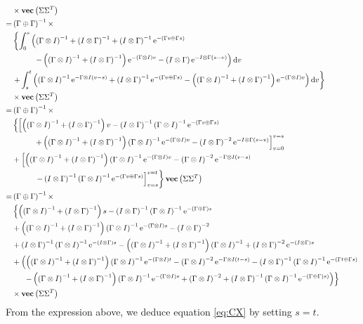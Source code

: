 \documentclass[10pt,a4paper]{article}
\newcommand{\rmd}{\text{d}}
\newcommand{\e}{\text{e}}
\newcommand{\inv}{^{-1}}
\newcommand{\GoI}{\left(\Gamma \otimes I \right)}
\newcommand{\IoG}{\left(I \otimes \Gamma \right)}
\newcommand{\GpG}{\left( \Gamma \oplus \Gamma \right)}
\newcommand{\Vect}[1]{\textbf{vec}\left(#1 \right)}
\begin{document}
\begin{align*}
&\times  \Vect{\Sigma\Sigma^T}\nonumber\\
=& \GpG\inv \times\\
&\left\lbrace   \int_0^s \left(  \GoI\inv + \IoG\inv  + \IoG\inv \e^{-(\Gamma v \oplus \Gamma s)} \right. \right.\nonumber\\
&\left.\hspace{1cm} - \left(\GoI\inv + \IoG\inv\right) \e^{-\GoI v} - \IoG\e^{- I \otimes \Gamma (s - v)} \right)\rmd v \\
&\left. + \int_s^t \left(  \GoI\inv \e^{- \Gamma \otimes I (v - s)} + \IoG\inv \e^{-(\Gamma v \oplus \Gamma s)} - \left(\GoI\inv + \IoG\inv\right) \e^{-\GoI v} \right) \rmd v \right\rbrace\nonumber\\
&\times  \Vect{\Sigma\Sigma^T}\nonumber\\
=& \GpG\inv \times\\
&\left\lbrace   \left[  \left(\GoI\inv + \IoG\inv\right)v  - \IoG\inv \GoI\inv \e^{-(\Gamma v \oplus \Gamma s)} \right. \right.\nonumber\\
&\left.\hspace{1cm} + \left(\GoI\inv + \IoG\inv\right)\GoI\inv \e^{-\GoI v} - \IoG^{-2}\e^{- I \otimes \Gamma (s - v)} \right]_{v=0}^{v=s}\nonumber\\
& + \left[\left(\GoI\inv + \IoG\inv\right)\GoI\inv \e^{-\GoI v} - \GoI^{-2}\e^{- \Gamma \otimes I (v - s)}\right.\nonumber \\
&\left. \left.\hspace{1cm}- \IoG\inv\GoI\inv \e^{-(\Gamma v \oplus \Gamma s)} \right]_{v=s}^{v=t}\right\rbrace \Vect{\Sigma\Sigma^T}\nonumber
\\
=& \GpG\inv \times\\
&\left\lbrace   \left(\GoI\inv + \IoG\inv\right)s - \IoG\inv \GoI\inv \e^{-\GpG s}\right.\nonumber\\
& + \left(\GoI\inv + \IoG\inv\right)\GoI\inv \e^{-\GoI s} - \IoG^{-2}  \\
& + \IoG\inv \GoI\inv \e^{-\IoG s} - \left(\GoI\inv + \IoG\inv\right)\GoI\inv + \IoG^{-2}\e^{-\IoG s}\nonumber 
\\
& + \left(\left(\GoI\inv + \IoG\inv\right)\GoI\inv \e^{-\GoI t} - \GoI^{-2}\e^{- \Gamma \otimes I (t - s)} - \IoG\inv\GoI\inv \e^{-(\Gamma t \oplus \Gamma s)}\right.\nonumber \\
&\left. \left.\hspace{0.5cm} - \left(\GoI\inv + \IoG\inv\right)\GoI\inv \e^{-\GoI s} + \GoI^{-2}  +\IoG\inv\GoI\inv \e^{-\GpG s)}  \right)\right\rbrace\nonumber\\
&\times  \Vect{\Sigma\Sigma^T}\nonumber
\end{align*}
From the expression above, we deduce equation \eqref{eq:CX} by setting $s = t$.
\end{document}

